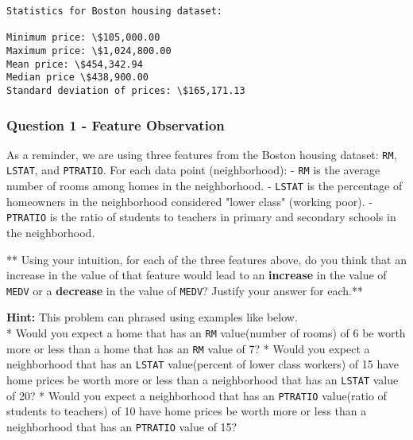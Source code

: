 \documentclass[11pt]{article}
\begin{document}
    \begin{Verbatim}[commandchars=\\\{\}]
Statistics for Boston housing dataset:

Minimum price: \$105,000.00
Maximum price: \$1,024,800.00
Mean price: \$454,342.94
Median price \$438,900.00
Standard deviation of prices: \$165,171.13

    \end{Verbatim}

    \subsubsection{Question 1 - Feature
Observation}\label{question-1---feature-observation}

As a reminder, we are using three features from the Boston housing
dataset: \texttt{\textquotesingle{}RM\textquotesingle{}},
\texttt{\textquotesingle{}LSTAT\textquotesingle{}}, and
\texttt{\textquotesingle{}PTRATIO\textquotesingle{}}. For each data
point (neighborhood): - \texttt{\textquotesingle{}RM\textquotesingle{}}
is the average number of rooms among homes in the neighborhood. -
\texttt{\textquotesingle{}LSTAT\textquotesingle{}} is the percentage of
homeowners in the neighborhood considered "lower class" (working poor).
- \texttt{\textquotesingle{}PTRATIO\textquotesingle{}} is the ratio of
students to teachers in primary and secondary schools in the
neighborhood.

** Using your intuition, for each of the three features above, do you
think that an increase in the value of that feature would lead to an
\textbf{increase} in the value of
\texttt{\textquotesingle{}MEDV\textquotesingle{}} or a \textbf{decrease}
in the value of \texttt{\textquotesingle{}MEDV\textquotesingle{}}?
Justify your answer for each.**

\textbf{Hint:} This problem can phrased using examples like below.\\
* Would you expect a home that has an
\texttt{\textquotesingle{}RM\textquotesingle{}} value(number of rooms)
of 6 be worth more or less than a home that has an
\texttt{\textquotesingle{}RM\textquotesingle{}} value of 7? * Would you
expect a neighborhood that has an
\texttt{\textquotesingle{}LSTAT\textquotesingle{}} value(percent of
lower class workers) of 15 have home prices be worth more or less than a
neighborhood that has an
\texttt{\textquotesingle{}LSTAT\textquotesingle{}} value of 20? * Would
you expect a neighborhood that has an
\texttt{\textquotesingle{}PTRATIO\textquotesingle{}} value(ratio of
students to teachers) of 10 have home prices be worth more or less than
a neighborhood that has an
\texttt{\textquotesingle{}PTRATIO\textquotesingle{}} value of 15?
\end{document}
